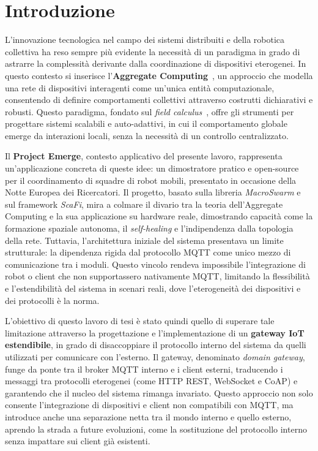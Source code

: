 \chapter{Introduzione}
\label{chap:introduzione}
%
L'innovazione tecnologica nel campo dei sistemi distribuiti e della robotica collettiva ha reso sempre più evidente la necessità di un paradigma in grado di astrarre la complessità derivante dalla coordinazione di dispositivi eterogenei. In questo contesto si inserisce l'\textbf{Aggregate Computing}~\cite{aggregateprogramming}, un approccio che modella una rete di dispositivi interagenti come un'unica entità computazionale, consentendo di definire comportamenti collettivi attraverso costrutti dichiarativi e robusti. Questo paradigma, fondato sul \textit{field calculus}~\cite{fieldcalculus}, offre gli strumenti per progettare sistemi scalabili e auto-adattivi, in cui il comportamento globale emerge da interazioni locali, senza la necessità di un controllo centralizzato.

Il \textbf{Project Emerge}, contesto applicativo del presente lavoro, rappresenta un'applicazione concreta di queste idee: un dimostratore pratico e open-source per il coordinamento di squadre di robot mobili, presentato in occasione della Notte Europea dei Ricercatori. Il progetto, basato sulla libreria \textit{MacroSwarm} e sul framework \textit{ScaFi}, mira a colmare il divario tra la teoria dell'Aggregate Computing e la sua applicazione su hardware reale, dimostrando capacità come la formazione spaziale autonoma, il \textit{self-healing} e l'indipendenza dalla topologia della rete. Tuttavia, l'architettura iniziale del sistema presentava un limite strutturale: la dipendenza rigida dal protocollo \ac{MQTT} come unico mezzo di comunicazione tra i moduli. Questo vincolo rendeva impossibile l'integrazione di robot o client che non supportassero nativamente \ac{MQTT}, limitando la flessibilità e l'estendibilità del sistema in scenari reali, dove l'eterogeneità dei dispositivi e dei protocolli è la norma.

L'obiettivo di questo lavoro di tesi è stato quindi quello di superare tale limitazione attraverso la progettazione e l'implementazione di un \textbf{gateway IoT estendibile}, in grado di disaccoppiare il protocollo interno del sistema da quelli utilizzati per comunicare con l'esterno. Il gateway, denominato \textit{domain gateway}, funge da ponte tra il broker \ac{MQTT} interno e i client esterni, traducendo i messaggi tra protocolli eterogenei (come \ac{HTTP} \ac{REST}, WebSocket e \ac{CoAP}) e garantendo che il nucleo del sistema rimanga invariato. Questo approccio non solo consente l'integrazione di dispositivi e client non compatibili con \ac{MQTT}, ma introduce anche una separazione netta tra il mondo interno e quello esterno, aprendo la strada a future evoluzioni, come la sostituzione del protocollo interno senza impattare sui client già esistenti.

